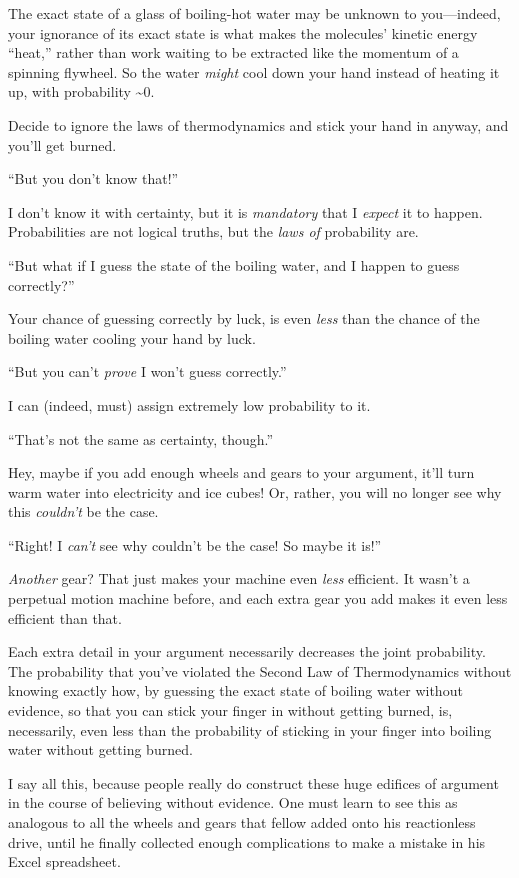 {
 The exact state of a glass of boiling-hot water may be unknown to
you---indeed, your ignorance of its exact state is what makes the
molecules' kinetic energy
``heat,'' rather than work waiting
to be extracted like the momentum of a spinning flywheel. So the water
\textit{might} cool down your hand instead of heating it up, with
probability \~{}0.}

{
 Decide to ignore the laws of thermodynamics and stick your hand in
anyway, and you'll get burned.}

{
 ``But you don't know
that!''}

{
 I don't know it with certainty, but it is
\textit{mandatory} that I \textit{expect} it to happen. Probabilities
are not logical truths, but the \textit{laws of} probability are.}

{
 ``But what if I guess the state of the boiling
water, and I happen to guess correctly?''}

{
 Your chance of guessing correctly by luck, is even \textit{less}
than the chance of the boiling water cooling your hand by luck.}

{
 ``But you can't \textit{prove} I
won't guess correctly.''}

{
 I can (indeed, must) assign extremely low probability to it.}

{
 ``That's not the same as
certainty, though.''}

{
 Hey, maybe if you add enough wheels and gears to your argument,
it'll turn warm water into electricity and ice cubes!
Or, rather, you will no longer see why this
\textit{couldn't} be the case.}

{
 ``Right! I \textit{can't} see why
couldn't be the case! So maybe it
is!''}

{
 \textit{Another} gear? That just makes your machine even
\textit{less} efficient. It wasn't a perpetual motion
machine before, and each extra gear you add makes it even less
efficient than that.}

{
 Each extra detail in your argument necessarily decreases the joint
probability. The probability that you've violated the
Second Law of Thermodynamics without knowing exactly how, by guessing
the exact state of boiling water without evidence, so that you can
stick your finger in without getting burned, is, necessarily, even less
than the probability of sticking in your finger into boiling water
without getting burned.}

{
 I say all this, because people really do construct these huge
edifices of argument in the course of believing without evidence. One
must learn to see this as analogous to all the wheels and gears that
fellow added onto his reactionless drive, until he finally collected
enough complications to make a mistake in his Excel spreadsheet.}


